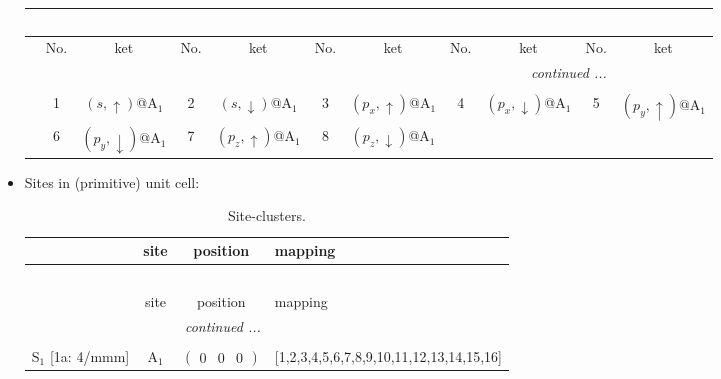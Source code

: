 \documentclass[fleqn,10pt,landscape]{article}
\begin{document}
\begin{itemize}
\begin{center}
\begin{longtable}{c|cc|cc|cc|cc|cc}
\multicolumn{10}{l}{\tablename\ \thetable{}} \\
 \hline \hline
 & No. & ket & No. & ket & No. & ket & No. & ket & No. & ket \\ \hline \endhead

 \hline \hline
\multicolumn{10}{r}{\footnotesize\it continued ...} \\ \endfoot

 \hline \hline
\multicolumn{10}{r}{} \\ \endlastfoot

 & 1 & $(s,\uparrow)$@A$_{1}$ & 2 & $(s,\downarrow)$@A$_{1}$ & 3 & $(p_{x},\uparrow)$@A$_{1}$ & 4 & $(p_{x},\downarrow)$@A$_{1}$ & 5 & $(p_{y},\uparrow)$@A$_{1}$ \\
& 6 & $(p_{y},\downarrow)$@A$_{1}$ & 7 & $(p_{z},\uparrow)$@A$_{1}$ & 8 & $(p_{z},\downarrow)$@A$_{1}$ &  &  &  &  \\
\end{longtable}
\end{center}

\item Sites in (primitive) unit cell:
\begin{center}
\renewcommand{\arraystretch}{1.3}
\begin{longtable}{cc|c|l}
\caption{Site-clusters.}
 \\
 \hline \hline
 & site & position & mapping \\ \hline \endfirsthead

\multicolumn{3}{l}{\tablename\ \thetable{}} \\
 \hline \hline
 & site & position & mapping \\ \hline \endhead

 \hline \hline
\multicolumn{3}{r}{\footnotesize\it continued ...} \\ \endfoot

 \hline \hline
\multicolumn{3}{r}{} \\ \endlastfoot

S$_{1}$ [1a: 4/mmm] & A$_1$ & $\begin{pmatrix} 0 & 0 & 0 \end{pmatrix}$ & [1,2,3,4,5,6,7,8,9,10,11,12,13,14,15,16] \\
\end{longtable}
\end{center}


\end{itemize}
\end{document}

